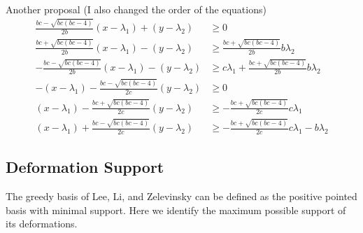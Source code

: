 \documentclass{amsart}
\numberwithin{theorem}{section}
\begin{document}
  Another proposal (I also changed the order of the equations)
  \begin{align}
    \frac{b c-\sqrt{b c (b c-4)}}{2 b}(x-\lambda_1)+(y-\lambda_2) & \geq0
    \\
    \frac{b c+\sqrt{b c (b c-4)}}{2 b}(x-\lambda_1)-(y-\lambda_2) & \geq \frac{b c+\sqrt{b c (b c-4)}}{2b}b\lambda_2 
    \\
    -\frac{b c-\sqrt{b c (b c-4)}}{2 b}(x-\lambda_1)-(y-\lambda_2)& \geq c\lambda_1+\frac{b c+\sqrt{b c (b c-4)}}{2b}b\lambda_2
    \\
    -(x-\lambda_1)-\frac{b c-\sqrt{b c (b c-4)}}{2 c}(y-\lambda_2)& \geq0
    \\
    (x-\lambda_1)-\frac{b c+\sqrt{b c (b c-4)}}{2 c}(y-\lambda_2) & \geq -\frac{b c+\sqrt{b c (b c-4)}}{2c}c\lambda_1
    \\
    (x-\lambda_1)+\frac{b c-\sqrt{b c (b c-4)}}{2 c}(y-\lambda_2) & \geq -\frac{b c+\sqrt{b c (b c-4)}}{2c}c\lambda_1-b\lambda_2
  \end{align}



  \subsection{Deformation Support}
  The greedy basis of Lee, Li, and Zelevinsky \cite{???} can be defined as the positive pointed basis with minimal support.
  Here we identify the maximum possible support of its deformations.
\end{document}
